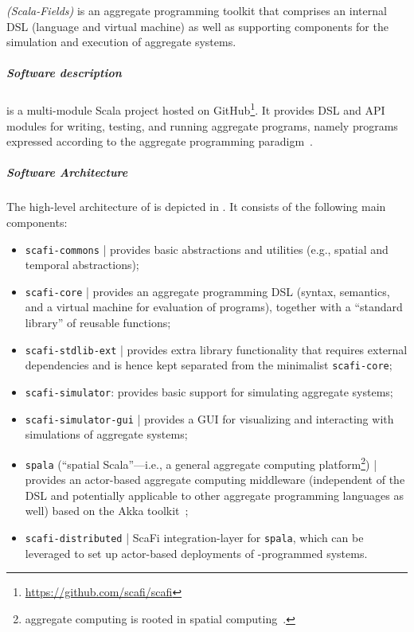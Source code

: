 \emph{\scafi{} (Scala-Fields)} is
 an aggregate programming toolkit
 that comprises an internal DSL (language and virtual machine)
 as well as supporting components for the simulation
 and execution %
 of aggregate systems.

\subparagraph{Software description}
\label{}
\scafi{} is a multi-module Scala project hosted on GitHub\footnote{\url{https://github.com/scafi/scafi}}.
%
It provides DSL and API modules for 
 writing, testing, and running aggregate programs, namely programs expressed according to the aggregate programming paradigm~\cite{aggregatecomputing,DBLP:journals/jlap/ViroliBDACP19}.
%
%
%
\subparagraph{Software Architecture}
\label{sec:scafi-arch-design}


The high-level architecture of \scafi{} is depicted in .
It consists of the following main components: %
\begin{itemize}
\item \texttt{scafi-commons} | provides basic abstractions and utilities (e.g., spatial and temporal abstractions);
\item \texttt{scafi-core} | provides an aggregate programming DSL (syntax, semantics, and a virtual machine for evaluation of programs), together with a ``standard library'' of reusable functions;
\item \texttt{scafi-stdlib-ext} | provides extra library functionality that requires external dependencies and is hence kept separated from the minimalist \texttt{scafi-core};
\item \texttt{scafi-simulator}: provides basic support for simulating aggregate systems;
\item \texttt{scafi-simulator-gui} | provides a GUI for visualizing and interacting with simulations of aggregate systems;
\item \texttt{spala} (``spatial Scala''---i.e., a general aggregate computing platform\footnote{aggregate computing is rooted in spatial computing~\cite{DBLP:journals/corr/abs-1202-5509}.}) | provides an actor-based aggregate computing middleware
(independent of the \scafi{} DSL and potentially applicable to other aggregate programming languages as well)
based on the Akka toolkit~\cite{akka};
\item \texttt{scafi-distributed} | ScaFi integration-layer for \texttt{spala},
which can be leveraged to set up actor-based deployments of \scafi{}-programmed systems.
\end{itemize}

